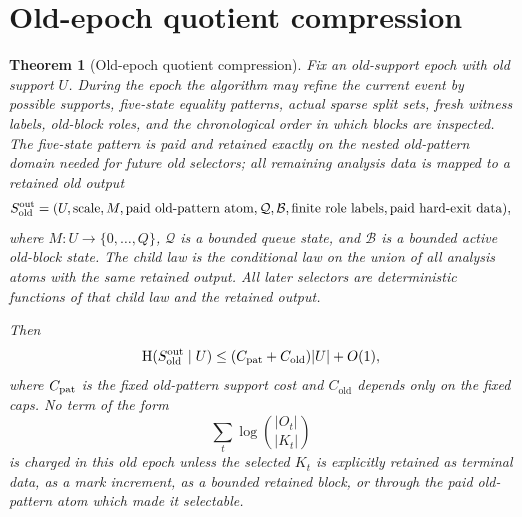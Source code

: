 \documentclass[11pt]{article}
\newtheorem{theorem}{Theorem}[section]
\theoremstyle{remark}
\newcommand{\HH}{\mathrm H}
\newcommand{\old}{\mathrm{old}}
\begin{document}
\section{Old-epoch quotient compression}

\begin{theorem}[Old-epoch quotient compression]\label{thm:old-epoch-quotient-compression}
Fix an old-support epoch with old support $U$.  During the epoch the algorithm may refine the current event by possible supports, five-state equality patterns, actual sparse split sets, fresh witness labels, old-block roles, and the chronological order in which blocks are inspected.  The five-state pattern is paid and retained exactly on the nested old-pattern domain needed for future old selectors; all remaining analysis data is mapped to a retained old output
\[
        S_{\old}^{\rm out}=(U,\hbox{scale},M,\hbox{paid old-pattern atom},\mathcal Q,\mathcal B,\hbox{finite role labels},\hbox{paid hard-exit data}),
\]
where $M:U\to\{0,\ldots,Q\}$, $\mathcal Q$ is a bounded queue state, and $\mathcal B$ is a bounded active old-block state.  The child law is the conditional law on the union of all analysis atoms with the same retained output.  All later selectors are deterministic functions of that child law and the retained output.

Then
\[
        \HH(S_{\old}^{\rm out}\mid U)\le (C_{\rm pat}+C_{\old})|U|+O(1),
\]
where $C_{\rm pat}$ is the fixed old-pattern support cost and $C_{\old}$ depends only on the fixed caps.  No term of the form
\[
        \sum_t \log { |O_t|\choose |K_t| }
\]
is charged in this old epoch unless the selected $K_t$ is explicitly retained as terminal data, as a mark increment, as a bounded retained block, or through the paid old-pattern atom which made it selectable.
\end{theorem}
\end{document}
